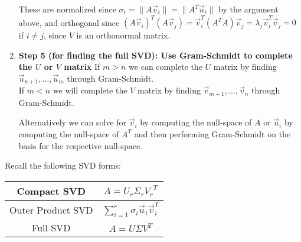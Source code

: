 \begin{enumerate}[label=(\roman*)]
  These are normalized since $\sigma_i = \|A \vec{v}_i\| = \|A^{T} \vec{u}_i \|$ by the argument above, and orthogonal since $(A\vec{v}_i)^T(A\vec{v}_j) = \vec{v}_i^T(A^T A)\vec{v}_j = \lambda_j \vec{v}_i^T\vec{v}_j = 0$ if $i \neq j$, since $V$ is an orthonormal matrix. 

  \item \textbf{Step 5 (for finding the full SVD): Use Gram-Schmidt to complete the $U$ or $V$ matrix} \vskip 1pt
  If $m > n$ we can complete the $U$ matrix by finding $\vec{u}_{n + 1}, \ldots, \vec{u}_{m}$ through Gram-Schmidt. \\
  If $m < n$ we will complete the $V$ matrix by finding $\vec{v}_{m + 1}, \ldots, \vec{v}_{n}$ through Gram-Schmidt.

  Alternatively we can solve for $\vec{v}_{i}$ by computing the null-space of $A$ or $\vec{u}_{i}$ by computing the null-space of $A^{T}$ and then performing Gram-Schmidt on the basis for the respective null-space.

\end{enumerate}

Recall the following SVD forms:

\begin{center} \begin{tabular}{|c|c|}
  \hline
  Compact SVD       & $A = U_r \Sigma_r {V_r}^T$ \\ \hline
  Outer Product SVD & $\sum_{i=1}^{r} \sigma_{i} \vec{u}_{i} \vec{v}_{i}^T$ \\ \hline
  Full SVD          & $A = U \Sigma V^T$ \\ \hline
\end{tabular} \end{center}

